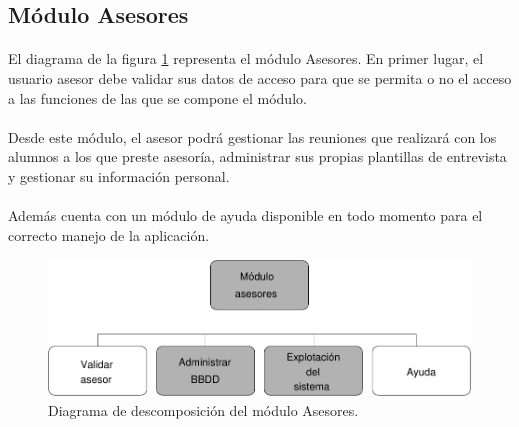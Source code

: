\subsection{Módulo Asesores}

  \paragraph{}El diagrama de la figura
  \ref{diagramaDescomposicionAsesores} representa el módulo Asesores. En primer
  lugar, el usuario asesor debe validar sus datos de acceso para que se permita
  o no el acceso a las funciones de las que se compone el módulo.

  \paragraph{}Desde este módulo, el asesor podrá gestionar las reuniones que
  realizará con los alumnos a los que preste asesoría, administrar sus propias
  plantillas de entrevista y gestionar su información personal.

  \paragraph{}Además cuenta con un módulo de ayuda disponible en todo momento
  para el correcto manejo de la aplicación.

  \begin{figure}[!ht]
    \begin{center}
      \includegraphics[]{11.Disenyo_Arquitectonico/11.2.Diagramas_Descomposicion/11.2.4.Modulo_asesores/Diagramas/asesores.pdf}
      \caption{Diagrama de descomposición del módulo Asesores.}
      \label{diagramaDescomposicionAsesores}
    \end{center}
  \end{figure}

% 
% 